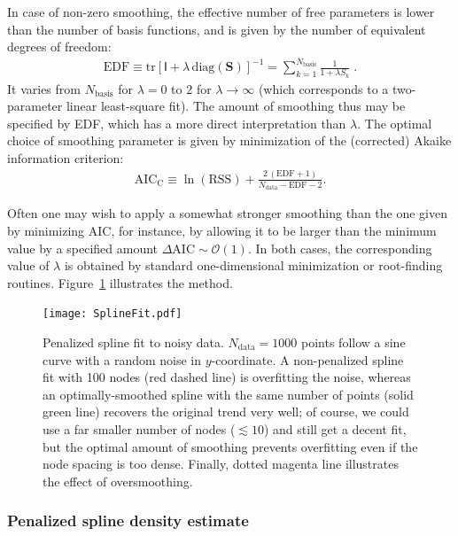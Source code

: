 \documentclass[12pt]{article}
\begin{document}
In case of non-zero smoothing, the effective number of free parameters is lower than the number of basis functions, and is given by the number of equivalent degrees of freedom:
\begin{align}
\mathrm{EDF} \equiv \mathrm{tr}[\mathsf{I} + \lambda\,\mathrm{diag}(\boldsymbol{S})]^{-1} =
\sum_{k=1}^{N_\mathrm{basis}} \frac{1}{1+\lambda S_k} \;.
\end{align}
It varies from $N_\mathrm{basis}$ for $\lambda=0$ to 2 for $\lambda\to\infty$ (which corresponds to a two-parameter linear least-square fit). The amount of smoothing thus may be specified by EDF, which has a more direct interpretation than $\lambda$. The optimal choice of smoothing parameter is given by minimization of the (corrected) Akaike information criterion:
\begin{align}
\mathrm{AIC_C} \equiv \ln(\mathrm{RSS}) + \frac{2\,(\mathrm{EDF}+1)}{N_\mathrm{data}-\mathrm{EDF}-2}.
\end{align}

Often one may wish to apply a somewhat stronger smoothing than the one given by minimizing AIC, for instance, by allowing it to be larger than the minimum value by a specified amount $\Delta\mathrm{AIC}\sim \mathcal{O}(1)$. In both cases, the corresponding value of $\lambda$ is  obtained by standard one-dimensional minimization or root-finding routines. Figure~\ref{fig:SplineFit} illustrates the method.

\begin{figure}[t]
\begin{center}
\texttt{[image: SplineFit.pdf]}
\end{center}
\caption{Penalized spline fit to noisy data. $N_\mathrm{data}=1000$ points follow a sine curve with a random noise in $y$-coordinate. A non-penalized spline fit with 100 nodes (red dashed line) is overfitting the noise, whereas an optimally-smoothed spline with the same number of points (solid green line) recovers the original trend very well; of course, we could use a far smaller number of nodes ($\lesssim 10$) and still get a decent fit, but the optimal amount of smoothing prevents overfitting even if the node spacing is too dense. Finally, dotted magenta line illustrates the effect of oversmoothing.
} \label{fig:SplineFit}
\end{figure}


\subsubsection{Penalized spline density estimate}  \label{sec:MathSplineDensityDetails}
\end{document}
